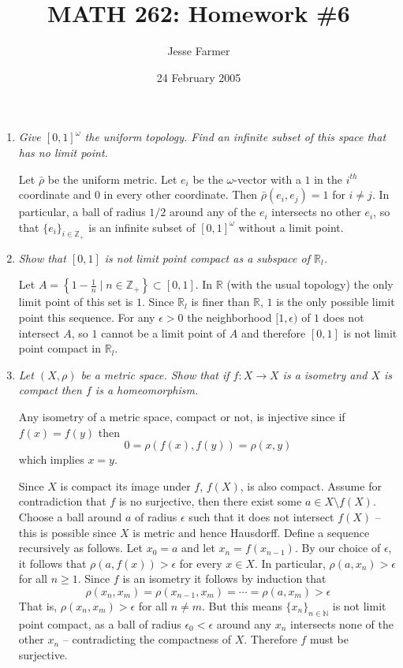 \documentclass[10pt]{article}
\title{MATH 262: Homework \#6}
\author{Jesse Farmer}
\date{24 February 2005}
\newcommand{\N}{\mathbb{N}}
\newcommand{\Z}{\mathbb{Z}}
\newcommand{\R}{\mathbb{R}}
\begin{document}
\maketitle
\begin{enumerate}

\item \emph{Give $[0,1]^\omega$ the uniform topology.  Find an infinite subset of this space that has no limit point.}

Let $\bar{\rho}$ be the uniform metric.  Let $e_i$ be the $\omega$-vector with a $1$ in the $i^{th}$ coordinate and $0$ in every other coordinate.  Then $\bar{\rho}(e_i, e_j) = 1$ for $i \neq j$.  In particular, a ball of radius $1/2$ around any of the $e_i$ intersects no other $e_i$, so that $\{e_i\}_{i \in \Z_+}$ is an infinite subset of $[0,1]^\omega$ without a limit point.
 
\item \emph{Show that $[0,1]$ is not limit point compact as a subspace of $\R_l$.}

Let $A = \left\{1 - \frac{1}{n} \mid n \in \Z_+ \right\} \subset [0,1]$.  In $\R$ (with the usual topology) the only limit point of this set is $1$.  Since $\R_l$ is finer than $\R$, $1$ is the only possible limit point this sequence.  For any $\epsilon > 0$ the neighborhood $[1, \epsilon)$ of $1$ does not intersect $A$, so $1$ cannot be a limit point of $A$ and therefore $[0,1]$ is not limit point compact in $\R_l$.

\item \emph{Let $(X, \rho)$ be a metric space.  Show that if $f: X \rightarrow X$ is a isometry and $X$ is compact then $f$ is a homeomorphism.}

Any isometry of a metric space, compact or not, is injective since if $f(x) = f(y)$ then $$0 = \rho(f(x), f(y)) = \rho(x,y)$$ which implies $x=y$.

Since $X$ is compact its image under $f$, $f(X)$, is also compact.  Assume for contradiction that $f$ is no surjective, then there exist some $a \in X \setminus f(X)$.  Choose a ball around $a$ of radius $\epsilon$ such that it does not intersect $f(X)$ -- this is possible since $X$ is metric and hence Hausdorff.  Define a sequence recursively as follows.  Let $x_0 = a$ and let $x_n = f(x_{n-1})$.  By our choice of $\epsilon$, it follows that $\rho(a, f(x)) > \epsilon$ for every $x \in X$.  In particular, $\rho(a, x_n) > \epsilon$ for all $n \geq 1$.  Since $f$ is an isometry it follows by induction that $$\rho(x_n, x_m) = \rho(x_{n-1}, x_m) = \cdots = \rho(a, x_m) > \epsilon$$  That is, $\rho(x_n, x_m) > \epsilon$ for all $n \neq m$.  But this means $\{x_n\}_{n \in \N}$ is not limit point compact, as a ball of radius $\epsilon_0 < \epsilon$ around any $x_n$ intersects none of the other $x_n$ -- contradicting the compactness of $X$.  Therefore $f$ must be surjective.


\end{enumerate}
\end{document}
